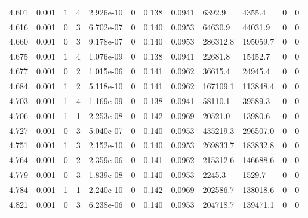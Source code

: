 \documentclass[preview]{standalone}
\begin{document}
{{{{{{\begin{tabular}{L{1.2cm}C{1.2cm} C{0.3cm}C{0.5cm} C{1.4cm}C{1.4cm} C{1.4cm}C{1.4cm} C{1.6cm}C{1.6cm} C{1.6cm}C{1.6cm}}
  4.601  &  0.001  & 1     &  4 &  2.926e-10  & 0  &  0.138&   0.0941& 6392.9 & 4355.4   &  0 & 0  \\ 
  4.616  &  0.001  & 0     &  3 &  6.702e-07  & 0  &  0.140&   0.0953& 64630.9 & 44031.9   &  0 & 0  \\ 
  4.660  &  0.001  & 0     &  3 &  9.178e-07  & 0  &  0.140&   0.0953& 286312.8 & 195059.7   &  0 & 0  \\ 
  4.675  &  0.001  & 1     &  4 &  1.076e-09  & 0  &  0.138&   0.0941& 22681.8 & 15452.7   &  0 & 0  \\ 
  4.677  &  0.001  & 0     &  2 &  1.015e-06  & 0  &  0.141&   0.0962& 36615.4 & 24945.4   &  0 & 0  \\ 
  4.684  &  0.001  & 1     &  2 &  5.118e-10  & 0  &  0.141&   0.0962& 167109.1 & 113848.4   &  0 & 0  \\ 
  4.703  &  0.001  & 1     &  4 &  1.169e-09  & 0  &  0.138&   0.0941& 58110.1 & 39589.3   &  0 & 0  \\ 
  4.706  &  0.001  & 1     &  1 &  2.253e-08  & 0  &  0.142&   0.0969& 20521.0 & 13980.6   &  0 & 0  \\ 
  4.727  &  0.001  & 0     &  3 &  5.040e-07  & 0  &  0.140&   0.0953& 435219.3 & 296507.0   &  0 & 0  \\ 
  4.751  &  0.001  & 1     &  3 &  2.152e-10  & 0  &  0.140&   0.0953& 269833.7 & 183832.8   &  0 & 0  \\ 
  4.764  &  0.001  & 0     &  2 &  2.359e-06  & 0  &  0.141&   0.0962& 215312.6 & 146688.6   &  0 & 0  \\ 
  4.779  &  0.001  & 0     &  3 &  1.839e-08  & 0  &  0.140&   0.0953& 2245.3 & 1529.7   &  0 & 0  \\ 
  4.784  &  0.001  & 1     &  1 &  2.240e-10  & 0  &  0.142&   0.0969& 202586.7 & 138018.6   &  0 & 0  \\ 
  4.821  &  0.001  & 0     &  3 &  6.238e-06  & 0  &  0.140&   0.0953& 204718.7 & 139471.1   &  0 & 0  \\ 
\hline 
\end{tabular} 

}}}}}}
\end{document}
